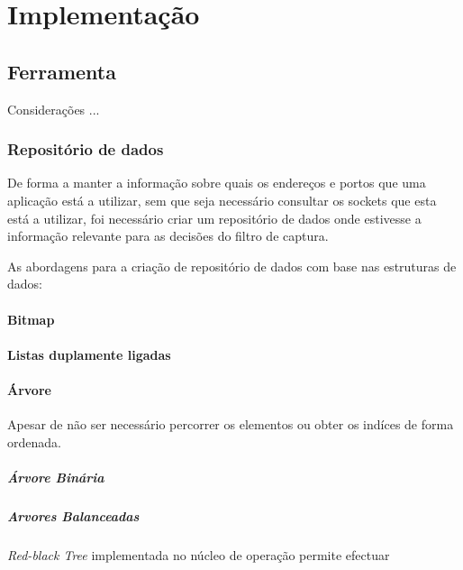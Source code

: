 \chapter{Implementação}
\label{cap:Implementacao}



\section{Ferramenta}
Considerações ...

\subsection{Repositório de dados}

De forma a manter a informação sobre quais os endereços e portos que uma
aplicação está a utilizar, sem que seja necessário consultar os sockets que
esta está a utilizar, foi necessário criar um repositório de dados onde
estivesse a informação relevante para as decisões do filtro de captura.

As abordagens para a criação de repositório de dados com base nas
estruturas de dados:

\subsubsection{Bitmap}

\subsubsection{Listas duplamente ligadas}

\subsubsection{Árvore}
Apesar de não ser necessário percorrer os elementos ou obter os indíces de
forma ordenada. 

\paragraph{Árvore Binária}


\paragraph{Arvores Balanceadas}
\textit{Red-black Tree} implementada no núcleo de operação permite efectuar

